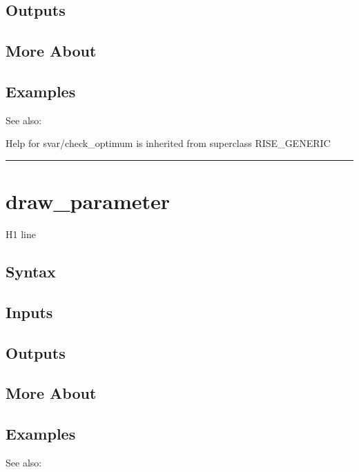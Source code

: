 \documentclass[letterpaper,10pt,english]{sphinxmanual}
\begin{document}
\subsection{Outputs}
\label{classes/models/@svar/svar:outputs}

\subsection{More About}
\label{classes/models/@svar/svar:more-about}

\subsection{Examples}
\label{classes/models/@svar/svar:examples}
See also:

Help for svar/check\_optimum is inherited from superclass RISE\_GENERIC


\bigskip\hrule{}\bigskip



\section{draw\_parameter}
\label{classes/models/@svar/svar:id2}\label{classes/models/@svar/svar:draw-parameter}
H1 line


\subsection{Syntax}
\label{classes/models/@svar/svar:id3}

\subsection{Inputs}
\label{classes/models/@svar/svar:id4}

\subsection{Outputs}
\label{classes/models/@svar/svar:id5}

\subsection{More About}
\label{classes/models/@svar/svar:id6}

\subsection{Examples}
\label{classes/models/@svar/svar:id7}
See also:
\end{document}
